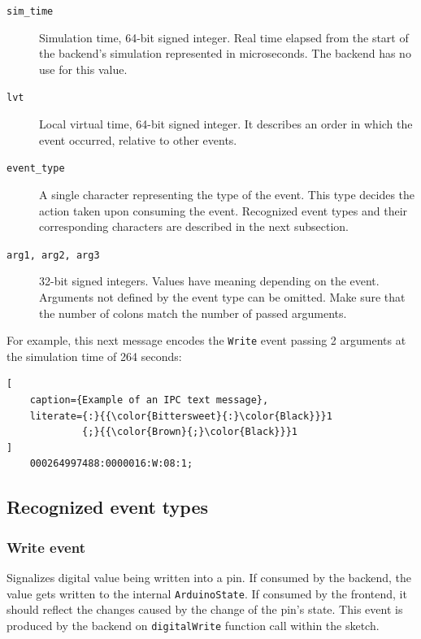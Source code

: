 
\begin{description}
    \item[\texttt{sim\_time}] Simulation time, 64-bit signed integer. Real time elapsed from the start of the backend's simulation represented in microseconds. The backend has no use for this value.
    \item[\texttt{lvt}] Local virtual time, 64-bit signed integer. It describes an order in which the event occurred, relative to other events.
    \item[\texttt{event\_type}] A single character representing the type of the event. This type decides the action taken upon consuming the event. Recognized event types and their corresponding characters are described in the next subsection.
    \item[\texttt{arg1, arg2, arg3}] 32-bit signed integers. Values have meaning depending on the event. Arguments not defined by the event type can be omitted. Make sure that the number of colons match the number of passed arguments.
\end{description}

For example, this next message encodes the \texttt{Write} event passing 2 arguments at the simulation time of 264 seconds:

\begin{lstlisting}[
    caption={Example of an IPC text message},
    literate={:}{{\color{Bittersweet}{:}\color{Black}}}1
             {;}{{\color{Brown}{;}\color{Black}}}1
]
    000264997488:0000016:W:08:1;
\end{lstlisting}

\subsection{Recognized event types}

\subsubsection{Write event}
Signalizes digital value being written into a pin. If consumed by the backend, the value gets written to the internal \texttt{ArduinoState}. If consumed by the frontend, it should reflect the changes caused by the change of the pin's state. This event is produced by the backend on \texttt{digitalWrite} function call within the sketch.

